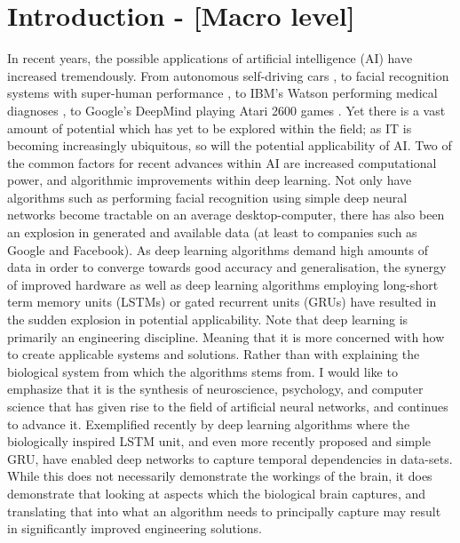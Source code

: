 
\chapter{Introduction - [Macro level]}\label{chpt:intro}


In recent years, the possible applications of artificial intelligence (AI) have increased tremendously. From autonomous self-driving cars \citep{Urmson2009}, to facial recognition systems with super-human performance \citep{Sun2014}, to IBM's Watson performing medical diagnoses \citep{Wagle2013}, to Google's DeepMind playing Atari 2600 games \citep{Mnih2015}. Yet there is a vast amount of potential which has yet to be explored within the field; as IT is becoming increasingly ubiquitous, so will the potential applicability of AI. Two of the common factors for recent advances within AI are increased computational power, and algorithmic improvements within deep learning. Not only have algorithms such as performing facial recognition using simple deep neural networks become tractable on an average desktop-computer, there has also been an explosion in generated and available data (at least to companies such as Google and Facebook). As deep learning algorithms demand high amounts of data in order to converge towards good accuracy and generalisation, the synergy of improved hardware as well as deep learning algorithms employing long-short term memory units (LSTMs) or gated recurrent units (GRUs) \citep{Hochreiter1997, Cho2014} have resulted in the sudden explosion in potential applicability. Note that deep learning is primarily an engineering discipline. Meaning that it is more concerned with how to create applicable systems and solutions. Rather than with explaining the biological system from which the algorithms stems from. I would like to emphasize that it is the synthesis of neuroscience, psychology, and computer science that has given rise to the field of artificial neural networks, and continues to advance it. Exemplified recently by deep learning algorithms where the biologically inspired LSTM unit, and even more recently proposed and simple GRU, have enabled deep networks to capture temporal dependencies in data-sets. While this does not necessarily demonstrate the workings of the brain, it does demonstrate that looking at aspects which the biological brain captures, and translating that into what an algorithm needs to principally capture may result in significantly improved engineering solutions.


